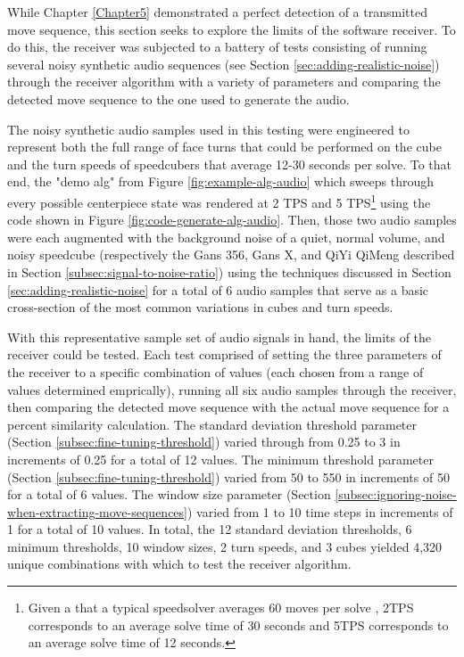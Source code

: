 While Chapter \ref{Chapter5} demonstrated a perfect detection of a
transmitted move sequence, this section seeks to explore the limits of
the software receiver. To do this, the receiver was subjected to a
battery of tests consisting of running several noisy synthetic audio
sequences (see Section \ref{sec:adding-realistic-noise}) through the
receiver algorithm with a variety of parameters and comparing the
detected move sequence to the one used to generate the audio.

The noisy synthetic audio samples used in this testing were engineered
to represent both the full range of face turns that could be performed
on the cube and the turn speeds of speedcubers that average 12-30
seconds per solve. To that end, the "demo alg" from Figure
\ref{fig:example-alg-audio} which sweeps through every possible
centerpiece state was rendered at 2 TPS and 5 TPS\footnote{Given a that
a typical speedsolver averages 60 moves per solve \cite{pochmann-hume}, 2TPS
corresponds to an average solve time of 30 seconds and 5TPS corresponds
to an average solve time of 12 seconds.} using the code shown in Figure
\ref{fig:code-generate-alg-audio}. Then, those two audio samples were
each augmented with the background noise of a quiet, normal volume, and
noisy speedcube (respectively the Gans 356, Gans X, and QiYi QiMeng
described in Section \ref{subsec:signal-to-noise-ratio}) using the
techniques discussed in Section \ref{sec:adding-realistic-noise} for a
total of 6 audio samples that serve as a basic cross-section of the
most common variations in cubes and turn speeds.

With this representative sample set of audio signals in hand, the
limits of the receiver could be tested. Each test comprised of setting
the three parameters of the receiver to a specific combination of
values (each chosen from a range of values determined emprically),
running all six audio samples through the receiver, then comparing the
detected move sequence with the actual move sequence for a percent
similarity calculation. The standard deviation threshold parameter
 (Section \ref{subsec:fine-tuning-threshold}) varied
through from 0.25 to 3 in increments of 0.25 for a total of 12 values.
The minimum threshold parameter  (Section
\ref{subsec:fine-tuning-threshold}) varied from 50 to 550 in increments
of 50 for a total of 6 values. The window size parameter
 (Section
\ref{subsec:ignoring-noise-when-extracting-move-sequences}) varied from
1 to 10 time steps in increments of 1 for a total of 10 values. In
total, the 12 standard deviation thresholds, 6 minimum thresholds, 10
window sizes, 2 turn speeds, and 3 cubes yielded 4,320 unique
combinations with which to test the receiver algorithm.


